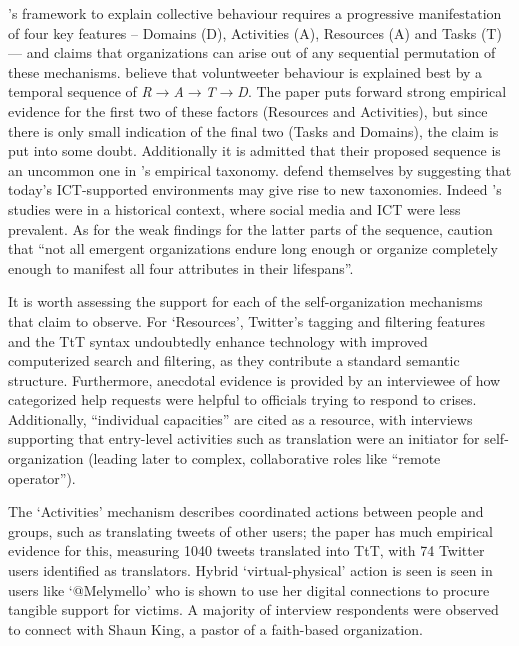 \documentclass[a4paper,12pt]{article}
\begin{document}
\citeauthor{kreps1994organizing}'s framework to explain collective behaviour requires a progressive manifestation of four key features -- Domains (D), Activities (A), Resources (A) and Tasks (T) --- and claims that organizations can arise out of any sequential permutation of these mechanisms. \citeauthor{Starbird:2011:VSD:1978942.1979102} believe that voluntweeter behaviour is explained best by a temporal sequence of \textit{R$\rightarrow$A$\rightarrow$T$\rightarrow$D}. The paper puts forward strong empirical evidence for the first two of these factors (Resources and Activities), but since there is only small indication of the final two (Tasks and Domains), the claim is put into some doubt. Additionally it is admitted that their proposed sequence is an uncommon one in \citeauthor{kreps1994organizing}'s empirical taxonomy. \citeauthor{Starbird:2011:VSD:1978942.1979102} defend themselves by suggesting that today's ICT-supported environments may give rise to new taxonomies. Indeed \citeauthor{kreps1994organizing}'s studies were in a historical context, where social media and ICT were less prevalent. As for the weak findings for the latter parts of the sequence, \citeauthor{Starbird:2011:VSD:1978942.1979102} caution that ``not all emergent organizations endure long enough or organize completely enough to manifest all four attributes in their lifespans''.

It is worth assessing the support for each of the self-organization mechanisms that \citeauthor{Starbird:2011:VSD:1978942.1979102} claim to observe. For `Resources', Twitter's tagging and filtering features and the TtT syntax undoubtedly enhance technology with improved computerized search and filtering, as they contribute a standard semantic structure. Furthermore, anecdotal evidence is provided by an interviewee of how categorized help requests were helpful to officials trying to respond to crises. Additionally, ``individual capacities'' are cited as a resource, with interviews supporting that entry-level activities such as translation were an initiator for self-organization (leading later to complex, collaborative roles like ``remote operator'').

The `Activities' mechanism describes coordinated actions between people and groups, such as translating tweets of other users; the paper has much empirical evidence for this, measuring 1040 tweets translated into TtT, with 74 Twitter users identified as translators. Hybrid `virtual-physical' action is seen is seen in users like `@Melymello' who is shown to use her digital connections to procure tangible support for victims. A majority of interview respondents were observed to connect with Shaun King, a pastor of a faith-based organization.
\end{document}
